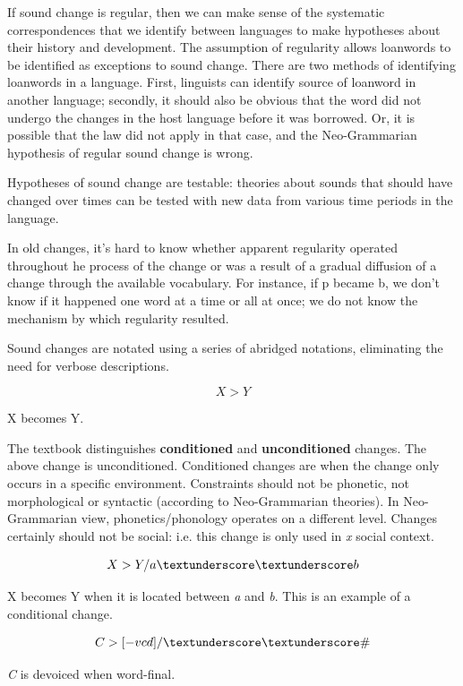 \documentclass{exam}
\begin{document}
If sound change is regular, then we can make sense of the systematic correspondences that we identify between languages to make hypotheses about their history and development. 
The assumption of regularity allows loanwords to be identified as exceptions to sound change. 
There are two methods of identifying loanwords in a language. 
First, linguists can identify source of loanword in another language; secondly, it should also be obvious that the word did not undergo the changes in the host language before it was borrowed. 
Or, it is possible that the law did not apply in that case, and the Neo-Grammarian hypothesis of regular sound change is wrong. 

Hypotheses of sound change are testable: theories about sounds that should have changed over times can be tested with new data from various time periods in the language. 

In old changes, it's hard to know whether apparent regularity operated throughout he process of the change or was a result of a gradual diffusion of a change through the available vocabulary. 
For instance, if p became b, we don't know if it happened one word at a time or all at once; we do not know the mechanism by which regularity resulted. 

Sound changes are notated using a series of abridged notations, eliminating the need for verbose descriptions. 


$$X >Y$$
\begin{center}
X becomes Y.
\end{center}


The textbook distinguishes \textbf{conditioned} and \textbf{unconditioned} changes. 
The above change is unconditioned. 
Conditioned changes are when the change only occurs in a specific environment. 
Constraints should not be phonetic, not morphological or syntactic (according to Neo-Grammarian theories). 
In Neo-Grammarian view, phonetics/phonology operates on a different level. 
Changes certainly should not be social: i.e. this change is only used in \textit{x} social context. 

$$X >Y/a \textunderscore\textunderscore b$$

\begin{center}
X becomes Y when it is located between \textit{a} and \textit{b}. 
This is an example of a conditional change. 
\end{center}


$$C>[-vcd]/\textunderscore\textunderscore \#$$

\begin{center}
\textit{C} is devoiced when word-final.  
\end{center}
\end{document}
